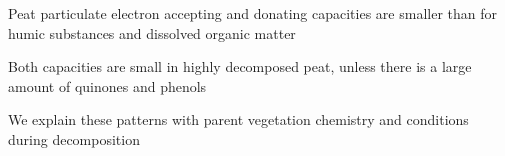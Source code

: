 \documentclass[draft,linenumbers]{agujournal2018}
\begin{document}




\begin{keypoints}
\item Peat particulate electron accepting and donating capacities are smaller
than for humic substances and dissolved organic matter
\item Both capacities are small in highly decomposed peat, unless there is a
large amount of quinones and phenols
\item We explain these patterns with parent vegetation chemistry and
conditions during decomposition
\end{keypoints}

%
%

\end{document}
